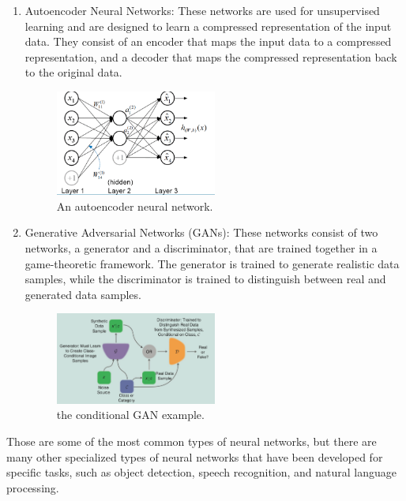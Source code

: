 \begin{enumerate}
    \item Autoencoder Neural Networks: These networks are used for unsupervised learning and are designed to learn a compressed
    representation of the input data. They consist of an encoder that maps the input data to a compressed representation, and a decoder
    that maps the compressed representation back to the original data.
    \begin{center}
        \begin{figure}[!ht]
            \centering
            \includegraphics[width=0.5\textwidth]{figures/ann}
            \caption{An autoencoder neural network. \cite{luo2018distributed}}
            \label{fig:ann}
        \end{figure}
    \end{center}
    \item Generative Adversarial Networks (GANs): These networks consist of two networks, a generator and a discriminator,
    that are trained together in a game-theoretic framework. The generator is trained to generate realistic data samples, while the discriminator is
    trained to distinguish between real and generated data samples.
    \begin{center}
        \begin{figure}[!ht]
            \centering
            \includegraphics[width=0.5\textwidth]{figures/gan}
            \caption{the conditional GAN example. \cite{creswell2018generative}}
            \label{fig:ann}
        \end{figure}
    \end{center}
\end{enumerate}
Those are some of the most common types of neural networks, but there are many other specialized types of neural networks that have been
developed for specific tasks, such as object detection, speech recognition, and natural language processing.\\
